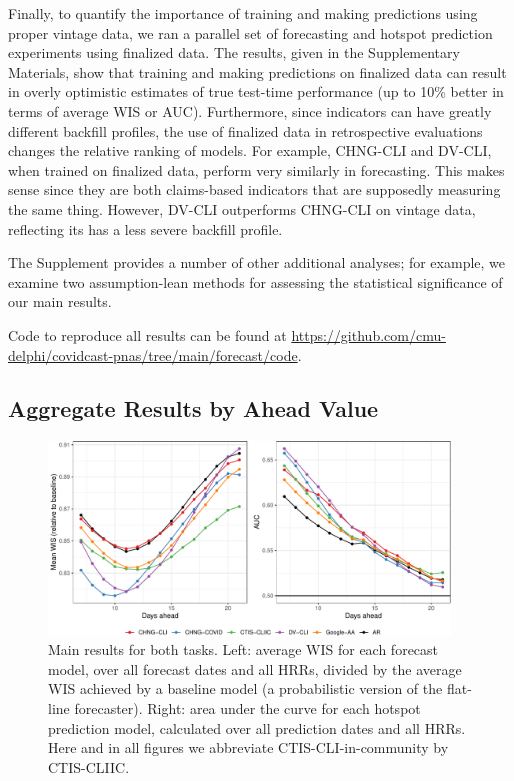 \documentclass[9pt,twocolumn,twoside,lineno]{pnas-new}
\begin{document}
Finally, to quantify the importance of training and making predictions using
proper vintage data, we ran a parallel set of forecasting and hotspot prediction
experiments using finalized data. The results, given in the Supplementary
Materials, show that training and making predictions on finalized data can
result in overly optimistic estimates of true test-time performance (up to 10\%
better in terms of average WIS or AUC). Furthermore, since indicators can have
greatly different backfill profiles, the use of finalized data in retrospective
evaluations changes the relative ranking of models.  For example, CHNG-CLI and
DV-CLI, when trained on finalized data, perform very similarly in forecasting.
This makes sense since they are both claims-based indicators that are supposedly
measuring the same thing.  However, DV-CLI outperforms CHNG-CLI on vintage data,
reflecting its has a less severe backfill profile. 

The Supplement provides a number of other additional analyses; for example, we
examine two assumption-lean methods for assessing the statistical significance
of our main results.

Code to reproduce all results can be found at
\url{https://github.com/cmu-delphi/covidcast-pnas/tree/main/forecast/code}. 

\subsection{Aggregate Results by Ahead Value}

\begin{figure}[t]
  \centering
  \includegraphics[width=0.95\textwidth]{fig/fcast-hot-combo-1.pdf}
  \caption{Main results for both tasks. Left: average WIS for each forecast
    model, over all forecast dates and all HRRs, divided by the average WIS
    achieved by a baseline model (a probabilistic version of the flat-line
    forecaster).  Right: area under the curve for each hotspot prediction model,
    calculated over all prediction dates and all HRRs.  Here and in all figures
    we abbreviate CTIS-CLI-in-community by CTIS-CLIIC.  
  }  
  \label{fig:forecast}
\end{figure}
\end{document}
